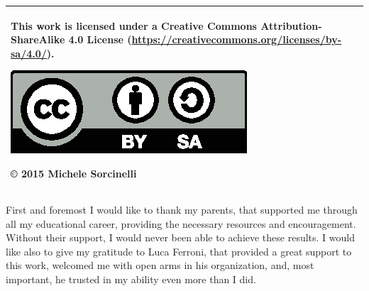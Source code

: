 \documentclass[a4paper,singleside,11pt]{report}
\begin{document}



\copertinatesi 
\begin{tabular}{|p{}|}
 \hline
 This work is licensed under a Creative Commons Attribution-ShareAlike 4.0
 License (\url{https://creativecommons.org/licenses/by-sa/4.0/}).
 \begin{center}
 \includegraphics[scale=1]{by-sa.eps}
 \end{center}
 © 2015 Michele Sorcinelli\\
 \hline
 \end{tabular}
\indice
\indicefigure
\indicetabelle
\iniziatesto









\appendix



\ringraziamenti

First and foremost I would like to thank my parents, that supported me through
all my educational career, providing the necessary resources and encouragement.
Without their support, I would never been able to achieve these results. I would
like also to give my gratitude to Luca Ferroni, that provided a great support to
this work, welcomed me with open arms in his organization, and, most important,
he trusted in my ability even more than I did.
\end{document}
